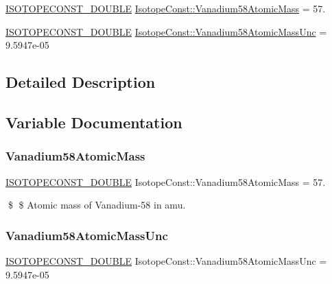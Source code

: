 \begin{DoxyCompactItemize}
\item 
\mbox{\hyperlink{group___isotope_const-_macros_ga8f45a7272ce02c0b4c65c44636ed719a}{I\+S\+O\+T\+O\+P\+E\+C\+O\+N\+S\+T\+\_\+\+D\+O\+U\+B\+LE}} \mbox{\hyperlink{group___isotope_const-_vanadium-_v58_gafafa6bc166d0d73d0c7c4922b5821b32}{Isotope\+Const\+::\+Vanadium58\+Atomic\+Mass}} = 57.
\item 
\mbox{\hyperlink{group___isotope_const-_macros_ga8f45a7272ce02c0b4c65c44636ed719a}{I\+S\+O\+T\+O\+P\+E\+C\+O\+N\+S\+T\+\_\+\+D\+O\+U\+B\+LE}} \mbox{\hyperlink{group___isotope_const-_vanadium-_v58_ga9c21338f1e8536f24c8ea1e35fc3404d}{Isotope\+Const\+::\+Vanadium58\+Atomic\+Mass\+Unc}} = 9.\+5947e-\/05
\end{DoxyCompactItemize}


\subsection{Detailed Description}


\subsection{Variable Documentation}
\mbox{\label{group___isotope_const-_vanadium-_v58_gafafa6bc166d0d73d0c7c4922b5821b32}} 
\subsubsection{\texorpdfstring{Vanadium58\+Atomic\+Mass}{Vanadium58AtomicMass}}
{\footnotesize\ttfamily \mbox{\hyperlink{group___isotope_const-_macros_ga8f45a7272ce02c0b4c65c44636ed719a}{I\+S\+O\+T\+O\+P\+E\+C\+O\+N\+S\+T\+\_\+\+D\+O\+U\+B\+LE}} Isotope\+Const\+::\+Vanadium58\+Atomic\+Mass = 57.}

\$ \$ Atomic mass of Vanadium-\/58 in amu. \mbox{\label{group___isotope_const-_vanadium-_v58_ga9c21338f1e8536f24c8ea1e35fc3404d}} 
\subsubsection{\texorpdfstring{Vanadium58\+Atomic\+Mass\+Unc}{Vanadium58AtomicMassUnc}}
{\footnotesize\ttfamily \mbox{\hyperlink{group___isotope_const-_macros_ga8f45a7272ce02c0b4c65c44636ed719a}{I\+S\+O\+T\+O\+P\+E\+C\+O\+N\+S\+T\+\_\+\+D\+O\+U\+B\+LE}} Isotope\+Const\+::\+Vanadium58\+Atomic\+Mass\+Unc = 9.\+5947e-\/05}

